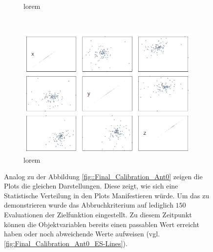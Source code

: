 \begin{figure}[!ht]
\begin{subfigure}[h]{0.4\textwidth}
                 \caption{lorem}
                 \label{fig:abortedFinal_Calibration_Ant0_ES-Lines}
         \end{subfigure}
%
\\
%
         \begin{subfigure}[h]{0.4\textwidth}
                 \centering
                 \includegraphics[width=\textwidth]{img/calibration/aborted_calibration_ant0-scatter.png}
                 \caption{lorem}
                 \label{fig:abortedFinal_Calibration_Ant0_ES-Scatter}
         \end{subfigure}
%
         \caption[Statistisch verteilte Ergebnisse der Evolutionären Kalibrierung]{Analog zu der Abbildung \ref{fig::Final_Calibration_Ant0} zeigen die Plots die gleichen Darstellungen. Diese zeigt, wie sich eine Statistische Verteilung in den Plots Manifestieren würde. Um das zu demonstrieren wurde das Abbruchkriterium auf lediglich $150$ Evaluationen der Zielfunktion eingestellt. Zu diesem Zeitpunkt können die Objektvariablen bereits einen passablen Wert erreicht haben oder noch abweichende Werte aufweisen (vgl. \ref{fig:Final_Calibration_Ant0_ES-Lines}).}
         \label{fig::abortedFinal_Calibration_Ant0_ES}
\end{figure}
%
